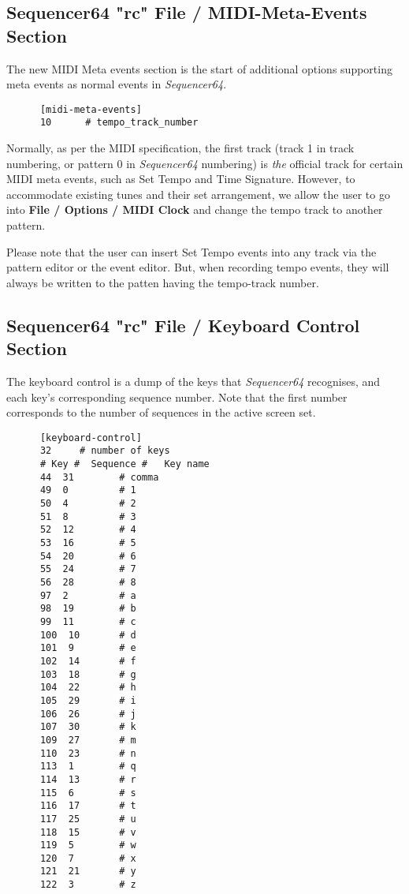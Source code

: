 \subsection{Sequencer64 "rc" File / MIDI-Meta-Events Section}
\label{subsec:seq64_rc_file_midi_meta_events}

   The new MIDI Meta events section is the start of additional options
   supporting meta events as normal events in \textsl{Sequencer64}.

   \begin{verbatim}
      [midi-meta-events]
      10      # tempo_track_number
   \end{verbatim}

   Normally, as per the MIDI specification, the first track (track 1 in track
   numbering, or pattern 0 in \textsl{Sequencer64} numbering) is \textsl{the}
   official track for certain MIDI meta events, such as Set Tempo and Time
   Signature.  However, to accommodate existing tunes and their set
   arrangement, we allow the user to go into \textbf{File / Options / MIDI
   Clock} and change the tempo track to another pattern.

   Please note that the user can insert Set Tempo events into any track via the
   pattern editor or the event editor.  But, when recording tempo events, they
   will always be written to the patten having the tempo-track number.

\subsection{Sequencer64 "rc" File / Keyboard Control Section}
\label{subsec:seq64_rc_file_keyboard_control}
        
   The keyboard control is a dump of the keys that \textsl{Sequencer64}
   recognises, and each key's corresponding sequence number.
   Note that the first number corresponds to the number of sequences in
   the active screen set.

   \begin{verbatim}
      [keyboard-control]
      32     # number of keys
      # Key #  Sequence #   Key name
      44  31        # comma
      49  0         # 1
      50  4         # 2
      51  8         # 3
      52  12        # 4
      53  16        # 5
      54  20        # 6
      55  24        # 7
      56  28        # 8
      97  2         # a
      98  19        # b
      99  11        # c
      100  10       # d
      101  9        # e
      102  14       # f
      103  18       # g
      104  22       # h
      105  29       # i
      106  26       # j
      107  30       # k
      109  27       # m
      110  23       # n
      113  1        # q
      114  13       # r
      115  6        # s
      116  17       # t
      117  25       # u
      118  15       # v
      119  5        # w
      120  7        # x
      121  21       # y
      122  3        # z
   \end{verbatim}

